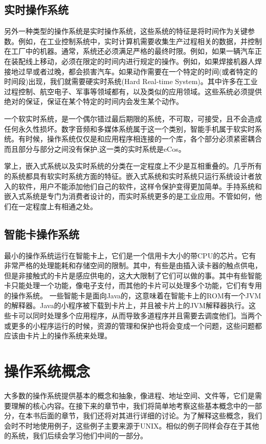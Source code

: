 	\subsection{实时操作系统}
	
	另外一种类型的操作系统是实时操作系统，这些系统的特征是将时间作为关键参数。例如，在工业控制系统中，实时计算机需要收集生产过程相关的数据，并控制在工厂中的机器。通常，系统还必须满足严格的最终时限。例如，如果一辆汽车正在装配线上移动，必须在限定的时间内进行规定的操作。例如，如果焊接机器人焊接地过早或者过晚，都会损害汽车。如果动作需要在一个特定的时间(或者特定的时间段)出现，我们就需要硬实时系统(Hard Real-time System)。其中许多在工业过程控制、航空电子、军事等领域都有，以及类似的应用领域。这些系统必须提供绝对的保证，保证在某个特定的时间内会发生某个动作。
	
	一个软实时系统，是一个偶尔错过最后期限的系统，不可取，可接受，且不会造成任何永久性损坏。数字音频和多媒体系统属于这一个类别，智能手机属于软实时系统。有时候，操作系统仅仅是和应用程序相连接的一个库，各个部分必须紧密耦合而且部分与部分之间没有保护,这一类的实时系统是eCos。
	
	掌上，嵌入式系统以及实时系统的分类在一定程度上不少是互相重叠的。几乎所有的系统都具有软实时系统方面的特征。嵌入式系统和实时系统只运行系统设计者放入的软件，用户不能添加他们自己的软件，这样令保护变得更加简单。手持系统和嵌入式系统是专门为消费者设计的，而实时系统更多的是工业应用。不管如何，他们在一定程度上有相通之处。
	
	\subsection{智能卡操作系统}
	
	最小的操作系统运行在智能卡上，它们是一个信用卡大小的带CPU的芯片。它有非常严格的处理能耗和存储空间的限制。其中，有些是由插入读卡器的触点供电，但是非接触式的卡片是感应供电的，这大大限制了它们可以做的事。其中有些智能卡只能处理一个功能，像电子支付，而其他的卡片可以处理多个功能，它们有专用的操作系统。
	一些智能卡是面向Java的，这意味着在智能卡上的ROM有一个JVM的解释器。Java的小程序被下载到卡片上，并且被卡片上的JVM解释器执行。这些卡可以同时处理多个应用程序，从而导致多道程序并且需要去调度他们。当两个或更多的小程序运行的时候，资源的管理和保护也将会变成一个问题，这些问题都应该由卡片上的操作系统来处理。
	
	\section{操作系统概念}
	
	大多数的操作系统提供基本的概念和抽象，像进程、地址空间、文件等，它们是需要理解的核心内容。在接下来的章节中，我们将简单地考察这些基本概念中的一部分，在本书后面的章节，我们还将对其进行详细的讨论。为了解释这些概念，我们会时不时地使用例子，这些例子主要来源于UNIX。相似的例子同样会存在于其他的系统，我们后续会学习他们中间的一部分。
	
